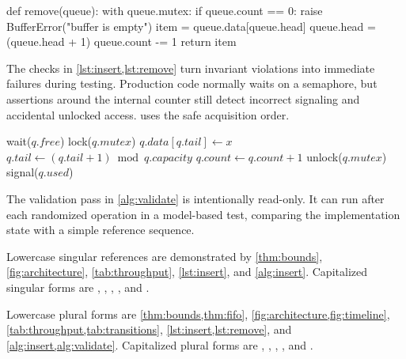 \documentclass[english]{../../unipd-notes}
\begin{document}
\begin{unipdcode}[language=Python,caption={A checked removal operation},label={lst:remove}]
def remove(queue):
    with queue.mutex:
        if queue.count == 0:
            raise BufferError("buffer is empty")
        item = queue.data[queue.head]
        queue.head = (queue.head + 1) %
        queue.count -= 1
        return item
\end{unipdcode}

The checks in \cref{lst:insert,lst:remove} turn invariant violations into immediate failures during testing. Production code normally waits on a semaphore, but assertions around the internal counter still detect incorrect signaling and accidental unlocked access.  uses the safe acquisition order.

\begin{algorithm}[H]
  \caption{Blocking insertion}\label{alg:insert}
  wait($q.free$)\;
  lock($q.mutex$)\;
  $q.data[q.tail]\gets x$\;
  $q.tail\gets(q.tail+1)\bmod q.capacity$\;
  $q.count\gets q.count+1$\;
  unlock($q.mutex$)\;
  signal($q.used$)\;
  \;
\end{algorithm}

The validation pass in \cref{alg:validate} is intentionally read-only. It can run after each randomized operation in a model-based test, comparing the implementation state with a simple reference sequence.

\begin{algorithm}[H]
  \caption{Queue-state validation}\label{alg:validate}
  \;
\end{algorithm}

Lowercase singular references are demonstrated by \cref{thm:bounds}, \cref{fig:architecture}, \cref{tab:throughput}, \cref{lst:insert}, and \cref{alg:insert}. Capitalized singular forms are , , , , and .

Lowercase plural forms are \cref{thm:bounds,thm:fifo}, \cref{fig:architecture,fig:timeline}, \cref{tab:throughput,tab:transitions}, \cref{lst:insert,lst:remove}, and \cref{alg:insert,alg:validate}. Capitalized plural forms are , , , , and .
\end{document}
